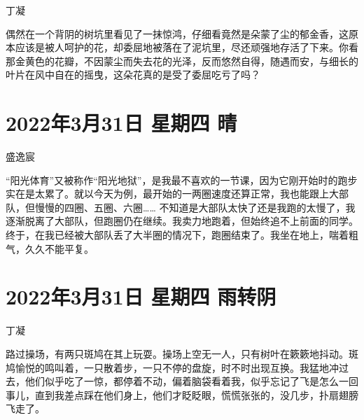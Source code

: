 丁凝

偶然在一个背阴的树坑里看见了一抹惊鸿，仔细看竟然是朵蒙了尘的郁金香，这原本应该是被人呵护的花，却委屈地被落在了泥坑里，尽还顽强地存活了下来。你看那金黄色的花瓣，不因蒙尘而失去花的光泽，反而悠然自得，随遇而安，与细长的叶片在风中自在的摇曳，这朵花真的是受了委屈吃亏了吗？

\section{2022年3月31日 星期四 晴}

盛逸宸

“阳光体育”又被称作“阳光地狱”，是我最不喜欢的一节课，因为它刚开始时的跑步实在是太累了。就以今天为例，最开始的一两圈速度还算正常，我也能跟上大部队，但慢慢的四圈、五圈、六圈…… 不知道是大部队太快了还是我跑的太慢了，我逐渐脱离了大部队，但跑圈仍在继续。我卖力地跑着，但始终追不上前面的同学。终于，在我已经被大部队丢了大半圈的情况下，跑圈结束了。我坐在地上，喘着粗气，久久不能平复。

\section{2022年3月31日 星期四 雨转阴}

丁凝

路过操场，有两只斑鸠在其上玩耍。操场上空无一人，只有树叶在簌簌地抖动。斑鸠愉悦的鸣叫着，一只散着步，一只不停的盘旋，时不时出现互换。我猛地冲过去，他们似乎吃了一惊，都停着不动，偏着脑袋看着我，似乎忘记了飞是怎么一回事儿，直到我差点踩在他们身上，他们才眨眨眼，慌慌张张的，没几步，扑扇翅膀飞走了。
